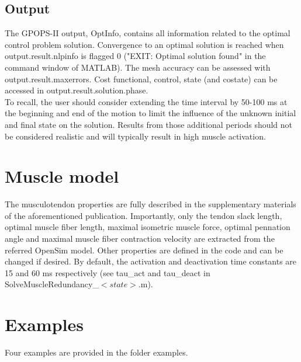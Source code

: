 \documentclass[a4paper,oneside,11pt]{article}
\begin{document}
\subsection{Output}

The GPOPS-II output, OptInfo, contains all information related to the optimal control problem solution. Convergence to an optimal solution is reached when output.result.nlpinfo is flagged 0 ("EXIT: Optimal solution found" in the command window of MATLAB). The mesh accuracy can be assessed with output.result.maxerrors. Cost functional, control, state (and costate) can be accessed in output.result.solution.phase. \\

To recall, the user should consider extending the time interval by 50-100 ms at the beginning and end of the motion to limit the influence of the unknown initial and final state on the solution. Results from those additional periods should not be considered realistic and will typically result in high muscle activation.

\section{Muscle model}

The musculotendon properties are fully described in the supplementary materials of the aforementioned publication. Importantly, only the tendon slack length, optimal muscle fiber length, maximal isometric muscle force, optimal pennation angle and maximal muscle fiber contraction velocity are extracted from the referred OpenSim model. Other properties are defined in the code and can be changed if desired. By default, the activation and deactivation time constants are 15 and 60 ms respectively (see tau_act and tau_deact in SolveMuscleRedundancy_$<state>$.m).

\section{Examples}

Four examples are provided in the folder examples.
\end{document}
